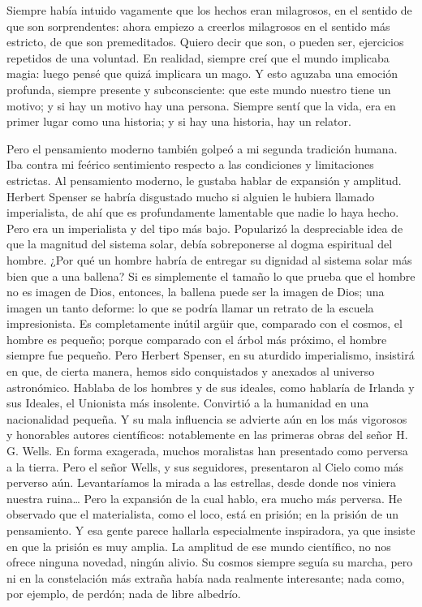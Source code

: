 Siempre había intuido vagamente que los hechos eran milagrosos, en el sentido de que son sorprendentes:
ahora empiezo a creerlos milagrosos en el sentido más estricto, de que son premeditados. Quiero decir
que son, o pueden ser, ejercicios repetidos de una voluntad. En realidad, siempre creí que el mundo
implicaba magia: luego pensé que quizá implicara un mago. Y esto aguzaba una emoción profunda,
siempre presente y subconsciente: que este mundo nuestro tiene un motivo; y si hay un motivo hay una
persona. Siempre sentí que la vida, era en primer lugar como una historia; y si hay una historia, hay un
relator.

Pero el pensamiento moderno también golpeó a mi segunda tradición humana. Iba contra mi feérico
sentimiento respecto a las condiciones y limitaciones estrictas. Al pensamiento moderno, le gustaba
hablar de expansión y amplitud. Herbert Spenser se habría disgustado mucho si alguien le hubiera
llamado imperialista, de ahí que es profundamente lamentable que nadie lo haya hecho. Pero era un
imperialista y del tipo más bajo. Popularizó la despreciable idea de que la magnitud del sistema solar,
debía sobreponerse al dogma espiritual del hombre. ¿Por qué un hombre habría de entregar su dignidad al
sistema solar más bien que a una ballena? Si es simplemente el tamaño lo que prueba que el hombre no es
imagen de Dios, entonces, la ballena puede ser la imagen de Dios; una imagen un tanto deforme: lo que se
podría llamar un retrato de la escuela impresionista. Es completamente inútil argüir que, comparado con
el cosmos, el hombre es pequeño; porque comparado con el árbol más próximo, el hombre siempre fue
pequeño. Pero Herbert Spenser, en su aturdido imperialismo, insistirá en que, de cierta manera, hemos
sido conquistados y anexados al universo astronómico. Hablaba de los hombres y de sus ideales, como
hablaría de Irlanda y sus Ideales, el Unionista más insolente. Convirtió a la humanidad en una
nacionalidad pequeña. Y su mala influencia se advierte aún en los más vigorosos y honorables autores
científicos: notablemente en las primeras obras del señor H.\,G. Wells. En forma exagerada, muchos
moralistas han presentado como perversa a la tierra. Pero el señor Wells, y sus seguidores, presentaron al
Cielo como más perverso aún. Levantaríamos la mirada a las estrellas, desde donde nos viniera nuestra
ruina…
Pero la expansión de la cual hablo, era mucho más perversa. He observado que el materialista,
como el loco, está en prisión; en la prisión de un pensamiento. Y esa gente parece hallarla especialmente
inspiradora, ya que insiste en que la prisión es muy amplia. La amplitud de ese mundo científico, no nos
ofrece ninguna novedad, ningún alivio. Su cosmos siempre seguía su marcha, pero ni en la constelación
más extraña había nada realmente interesante; nada como, por ejemplo, de perdón; nada de libre albedrío.

